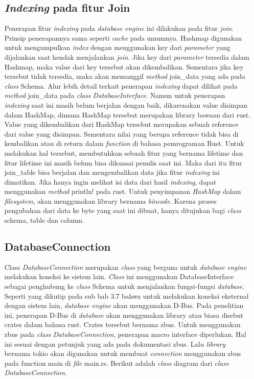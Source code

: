 \subsection{\emph{Indexing} pada fitur Join}
Penerapan fitur \emph{indexing} pada \emph{database engine} ini dilakukan pada fitur \emph{join}. Prinsip penerapannya sama seperti \emph{cache} pada umumnya. Hashmap digunakan
untuk mengumpulkan \emph{index} dengan menggunakan key dari \emph{parameter} yang dijalankan saat hendak menjalankan \emph{join}. Jika key dari \emph{parameter} tersedia dalam Hashmap, maka value dari
key tersebut akan dikembalikan. Sementara jika key tersebut tidak tersedia, maka akan memanggil \emph{method} join\_data yang ada pada \emph{class} Schema. Alur lebih detail terkait 
penerapan \emph{indexing} dapat dilihat pada \emph{method} join\_data pada \emph{class} \emph{DatabaseInterface}. Namun untuk penerapan \emph{indexing} saat ini masih belum berjalan dengan baik,
dikarenakan value disimpan dalam HashMap, dimana HashMap tersebut merupakan library bawaan dari rust. Value yang dikembalikan dari HashMap tersebut merupakan sebuah reference
dari value yang disimpan. Sementara nilai yang berupa reference tidak bisa di kembalikan atau di return dalam \emph{function} di bahasa pemrograman Rust. Untuk melakukan hal tersebut,
membutuhkan sebuah fitur yang bernama lifetime dan fitur lifetime ini masih belum bisa dikuasai penulis saat ini. Maka dari itu fitur join\_table bisa berjalan dan mengembalikan data
jika fitur \emph{indexing} ini dimatikan. Jika hanya ingin melihat isi data dari hasil \emph{indexing}, dapat menggunakan \emph{method} println! pada rust. Untuk penyimpanan \emph{HashMap} dalam \emph{filesystem}, 
akan menggunakan library bernama \emph{bincode}. Karena proses pengubahan dari data ke byte yang saat ini dibuat, hanya ditujukan
bagi \emph{class} schema, table dan column. 


\subsection{DatabaseConnection}
Class \emph{DatabaseConnection} merupakan \emph{class} yang berguna untuk \emph{database engine} melakukan koneksi ke sistem lain. \emph{Class} ini menggunakan 
DatabaseInterface sebagai penghubung ke \emph{class} Schema untuk menjalankan fungsi-fungsi \emph{database}. Seperti yang dikutip pada sub bab 3.7 bahwa untuk
melakukan koneksi eksternal dengan sistem lain, \emph{database engine} akan menggunakan D-Bus. Pada penelitian ini, penerapan D-Bus di \emph{database} akan menggunakan
library atau biasa disebut crates dalam bahasa rust. Crates tersebut bernama zbus. Untuk menggunakan zbus pada \emph{class} \emph{DatabaseConnection}, penerapan macro
interface diperlukan. Hal ini sesuai dengan petunjuk yang ada pada dokumentasi zbus. Lalu \emph{library} bernama tokio akan digunakan
untuk membuat \emph{connection} menggunakan zbus pada function main di \emph{file} main.rs. Berikut adalah \emph{class} diagram dari \emph{class} \emph{DatabaseConnection}.


